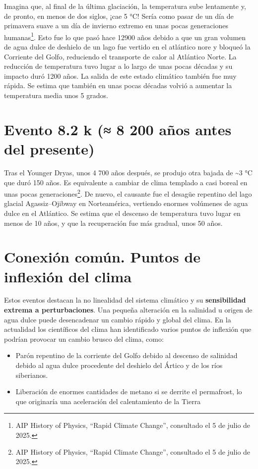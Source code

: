 \documentclass[
  11pt,
  a4paper,
  DIV=11,
  numbers=noendperiod]{scrreprt}
\providecommand{\tightlist}{%
  \setlength{\itemsep}{0pt}\setlength{\parskip}{0pt}}
\begin{document}
Imagina que, al final de la última glaciación, la temperatura sube
lentamente y, de pronto, en menos de dos siglos, ¡cae 5 °C! Sería como
pasar de un día de primavera suave a un día de invierno extremo en unas
pocas generaciones humanas\footnote{AIP History of Physics, ``Rapid
  Climate Change'', consultado el 5 de julio de 2025.}. Esto fue lo que
pasó hace 12900 años debido a que un gran volumen de agua dulce de
deshielo de un lago fue vertido en el atlántico nore y bloqueó la
Corriente del Golfo, reduciendo el transporte de calor al Atlántico
Norte. La reducción de temperatura tuvo lugar a lo largo de unas pocas
décadas y su impacto duró 1200 años. La salida de este estado climático
también fue muy rápida. Se estima que también en unas pocas décadas
volvió a aumentar la temperatura media unos 5 grados.

\section{Evento 8.2 k (≈ 8 200 años antes del
presente)}\label{evento-8.2-k-8-200-auxf1os-antes-del-presente}

Tras el Younger Dryas, unos 4 700 años después, se produjo otra bajada
de \textasciitilde3 °C que duró 150 años. Es equivalente a cambiar de
clima templado a casi boreal en unas pocas generaciones\footnote{AIP
  History of Physics, ``Rapid Climate Change'', consultado el 5 de julio
  de 2025.}. De nuevo, el causante fue el desagüe repentino del lago
glacial Agassiz--Ojibway en Norteamérica, vertiendo enormes volúmenes de
agua dulce en el Atlántico. Se estima que el descenso de temperatura
tuvo lugar en menos de 10 años, y que la recuperación fue más gradual,
unos 50 años.

\section{Conexión común. Puntos de inflexión del
clima}\label{conexiuxf3n-comuxfan.-puntos-de-inflexiuxf3n-del-clima}

Estos eventos destacan la no linealidad del sistema climático y su
\textbf{sensibilidad extrema a perturbaciones}. Una pequeña alteración
en la salinidad u origen de agua dulce puede desencadenar un cambio
rápido y global del clima. En la actualidad los científicos del clima
han identificado varios puntos de inflexión que podrían provocar un
cambio brusco del clima, como:

\begin{itemize}
\tightlist
\item
  Parón repentino de la corriente del Golfo debido al descenso de
  salinidad debido al agua dulce procedente del deshielo del Ártico y de
  los ríos siberianos.
\item
  Liberación de enormes cantidades de metano si se derrite el
  permafrost, lo que originaría una aceleración del calentamiento de la
  Tierra
\end{itemize}
\end{document}

